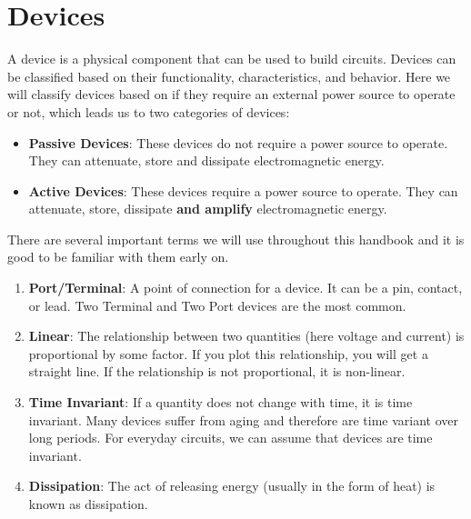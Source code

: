 \chapter{Devices}\label{ch:devices}

A device is a physical component that can be used to build circuits.
Devices can be classified based on their functionality, characteristics,
and behavior. Here we will classify devices based on if they require
an external power source to operate or not, which leads us to two
categories of devices:
\begin{itemize}
    \item \textbf{Passive Devices}: These devices do not require a power
      source to operate. They can attenuate, store and dissipate
      electromagnetic energy.
    \item \textbf{Active Devices}: These devices require a power source to
      operate. They can attenuate, store, dissipate \textbf{and amplify}
      electromagnetic energy.
\end{itemize}

There are several important terms we will use throughout this handbook
and it is good to be familiar with them early on.
\begin{enumerate}
    \item \textbf{Port/Terminal}: A point of connection for a device.
      It can be a pin, contact, or lead. Two Terminal and Two Port
      devices are the most common.
    \item \textbf{Linear}: The relationship between two quantities (here
      voltage and current) is proportional by some factor. If you plot
      this relationship, you will get a straight line. If the relationship
      is not proportional, it is non-linear.
    \item \textbf{Time Invariant}: If a quantity does not change with time,
      it is time invariant. Many devices suffer from aging and therefore
      are time variant over long periods. For everyday circuits, we can
      assume that devices are time invariant.
    \item \textbf{Dissipation}: The act of releasing energy (usually in the
      form of heat) is known as dissipation.
\end{enumerate}









